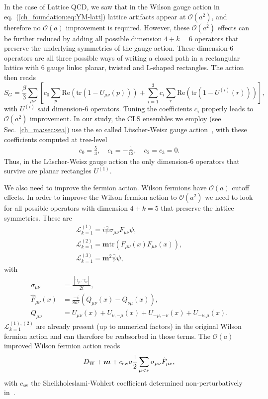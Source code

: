 In the case of Lattice QCD, we saw that in the Wilson gauge action in eq.~(\ref{ch_foundation:eq:YM-latt}) lattice artifacts appear at $\mathcal{O}(a^2)$, and therefore no $\mathcal{O}(a)$ improvement is required. However, these $\mathcal{O}(a^2)$ effects can be further reduced by adding all possible dimension $4+k=6$ operators that preserve the underlying symmetries of the gauge action. These dimension-6 operators are all three possible ways of writing a closed path in a rectangular lattice with 6 gauge links: planar, twisted and L-shaped rectangles. The action then reads
\begin{equation}
\label{ch_foundation:eq:SG_impr}
S_G=\frac{\beta}{3}\sum_{\mu\nu}\left[c_0\sum_p{\textrm{Re}}\left({\textrm{tr}}\left(1-U_{\mu\nu}(p)\right)\right)+\sum_{i=1}^3c_i\sum_r{\textrm{Re}}\left({\textrm{tr}}\left(1-U^{(i)}(r)\right)\right)\right],
\end{equation}
with $U^{(i)}$ said dimension-6 operators. Tuning the coefficients $c_i$ properly leads to $\mathcal{O}(a^2)$ improvement. In our study, the CLS ensembles we employ (see Sec.~\ref{ch_ma:sec:sea}) use the so called Lüscher-Weisz gauge action~\cite{}, with these coefficients computed at tree-level
\begin{gather}
\label{ch_foundation:eq:LW}
c_0=\frac{5}{3}, \quad
c_1=-\frac{1}{12}, \quad
c_2=c_3=0.
\end{gather}
Thus, in the Lüscher-Weisz gauge action the only dimension-6 operators that survive are planar rectangles $U^{(1)}$.

We also need to improve the fermion action. Wilson fermions have $\mathcal{O}(a)$ cutoff effects. In order to improve the Wilson fermion action to $\mathcal{O}(a^2)$ we need to look for all possible operators with dimension $4+k=5$ that preserve the lattice symmetries. These are
\begin{gather}
\mathcal{L}_{k=1}^{(1)}=i\bar{\psi}\sigma_{\mu\nu}F_{\mu\nu}\psi,\\
\mathcal{L}_{k=1}^{(2)}=\boldsymbol{m}{\textrm{tr}}\left(F_{\mu\nu}(x)F_{\mu\nu}(x)\right),\\
\mathcal{L}_{k=1}^{(3)}=\boldsymbol{m}^2\bar{\psi}\psi,
\end{gather}
with
\begin{align}
\label{ch_foundation:eq:dim5-op}
\sigma_{\mu\nu}&=\frac{\left[\gamma_{\mu},\gamma_{\nu}\right]}{2i},\\
\hat{F}_{\mu\nu}(x)&=\frac{-i}{8a^2}\left(Q_{\mu\nu}(x)-Q_{\nu\mu}(x)\right),\\
Q_{\mu\nu}&=U_{\mu\nu}(x)+U_{\nu,-\mu}(x)+U_{-\mu,-\nu}(x)+U_{-\nu,\mu}(x).
\end{align}
$\mathcal{L}_{k=1}^{(1),(2)}$ are already present (up to numerical factors) in the original Wilson fermion action and can therefore be reabsorbed in those terms. The $\mathcal{O}(a)$ improved Wilson fermion action reads
\begin{equation}
\label{ch_foundation:eq:DW_impr}
D_{\textrm W}+\boldsymbol{m}+c_{\textrm{sw}}a\frac{1}{2}\sum_{\mu<\nu}\sigma_{\mu\nu}\hat{F}_{\mu\nu},
\end{equation}
with $c_{\textrm{sw}}$ the Sheikholeslami-Wohlert coefficient determined non-perturbatively in~\cite{}.

